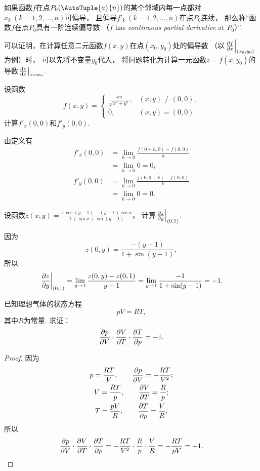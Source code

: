 \begin{definition}
如果函数\(f\)在点\(P_0(\AutoTuple{a}{n})\)的某个邻域内每一点都对\(x_k\ (k=1,2,\dotsc,n)\)可偏导，
且偏导\(f'_k\ (k=1,2,\dotsc,n)\)在点\(P_0\)连续，
那么称“函数\(f\)在点\(P_0\)具有一阶连续偏导数
（\(f\) has \emph{continuous partial derivative} at \(P_0\)）”.
\end{definition}

可以证明，在计算任意二元函数\(f(x,y)\)在点\((x_0,y_0)\)处的偏导数
（以\(\eval{\pdv{f}{x}}_{(x_0,y_0)}\)为例）时，
可以先将不变量\(y_0\)代入，
将问题转化为计算一元函数\(z = f(x, y_0)\)的导数\(\eval{\dv{z}{x}}_{x=x_0}\).

\begin{example}
设函数\[
	f(x,y) = \left\{ \begin{array}{cl}
		\frac{xy}{\sqrt{x^2+y^2}}, & (x,y)\neq(0,0), \\
		0, & (x,y)=(0,0).
	\end{array} \right.
\]
计算\(f'_x(0,0)\)和\(f'_y(0,0)\).
\begin{solution}
由定义有\begin{align*}
	f'_x(0,0)
	&= \lim_{h\to0} \frac{f(0+h,0) - f(0,0)}{h} \\
	&= \lim_{h\to0} 0
	= 0, \\
	f'_y(0,0)
	&= \lim_{k\to0} \frac{f(0,0+k) - f(0,0)}{k} \\
	&= \lim_{k\to0} 0
	= 0.
\end{align*}
\end{solution}
\end{example}
\begin{example}
设函数\(z(x,y) = \frac{x \cos(y-1) - (y-1) \cos x}{1 + \sin x + \sin(y-1)}\)，
计算\(\eval{\pdv{z}{y}}_{(0,1)}\).
\begin{solution}
因为\[
	z(0,y) = \frac{-(y-1)}{1 + \sin(y-1)},
\]
所以\[
	\eval{\pdv{z}{y}}_{(0,1)}
	= \lim_{y\to1} \frac{z(0,y) - z(0,1)}{y - 1}
	= \lim_{y\to1} \frac{-1}{1 + \sin(y-1)}
	= -1.
\]
\end{solution}
\end{example}

\begin{example}
已知理想气体的状态方程\[
	pV = RT,
\]
其中\(R\)为常量.
求证：\[
	\pdv{p}{V} \cdot \pdv{V}{T} \cdot \pdv{T}{p} = -1.
\]
\begin{proof}
因为\begin{gather*}
	p = \frac{RT}{V},
	\qquad
	\pdv{p}{V} = -\frac{RT}{V^2}; \\
	V = \frac{RT}{p},
	\qquad
	\pdv{V}{T} = \frac{R}{p}; \\
	T = \frac{pV}{R},
	\qquad
	\pdv{T}{p} = \frac{V}{R},
\end{gather*}
所以\[
	\pdv{p}{V} \cdot \pdv{V}{T} \cdot \pdv{T}{p}
	= -\frac{RT}{V^2} \cdot \frac{R}{p} \cdot \frac{V}{R}
	= -\frac{RT}{pV} = -1.
	\qedhere
\]
\end{proof}
\end{example}

